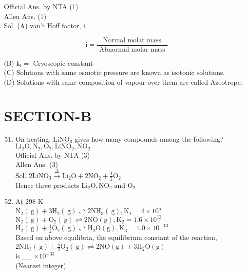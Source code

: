 \documentclass[10pt]{article}
\begin{document}
Official Ans. by NTA (1)\\
Allen Ans. (1)\\
Sol. (A) van't Hoff factor, i

\[
\mathrm{i}=\frac{\text { Normal molar mass }}{\text { Abnormal molar mass }}
\]

(B) \(\mathrm{k}_{\mathrm{f}}=\) Cryoscopic constant\\
(C) Solutions with same osmotic pressure are known as isotonic solutions.\\
(D) Solutions with same composition of vapour over them are called Azeotrope.

\section*{SECTION-B}
\begin{enumerate}
  \setcounter{enumi}{50}
  \item On heating, \(\mathrm{LiNO}_{3}\) gives how many compounds among the following?\\
\(\mathrm{Li}_{2} \mathrm{O}, \mathrm{N}_{2}, \mathrm{O}_{2}, \mathrm{LiNO}_{2}, \mathrm{NO}_{2}\)\\
Official Ans. by NTA (3)\\
Allen Ans. (3)\\
Sol. \(2 \mathrm{Li} \mathrm{NO}_{3} \xrightarrow{\Delta} \mathrm{Li}_{2} \mathrm{O}+2 \mathrm{NO}_{2}+\frac{1}{2} \mathrm{O}_{2}\)\\
Hence three products \(\mathrm{Li}_{2} \mathrm{O}, \mathrm{NO}_{2}\) and \(\mathrm{O}_{2}\)
  \item At 298 K\\
\(\mathrm{N}_{2}(\mathrm{~g})+3 \mathrm{H}_{2}(\mathrm{~g}) \rightleftharpoons 2 \mathrm{NH}_{3}(\mathrm{~g}), \mathrm{K}_{1}=4 \times 10^{5}\)\\
\(\mathrm{N}_{2}(\mathrm{~g})+\mathrm{O}_{2}(\mathrm{~g}) \rightleftharpoons 2 \mathrm{NO}(\mathrm{g}), \mathrm{K}_{2}=1.6 \times 10^{12}\)\\
\(\mathrm{H}_{2}(\mathrm{~g})+\frac{1}{2} \mathrm{O}_{2}(\mathrm{~g}) \rightleftharpoons \mathrm{H}_{2} \mathrm{O}(\mathrm{g}), \mathrm{K}_{3}=1.0 \times 10^{-13}\)\\
Based on above equilibria, the equilibrium constant of the reaction,\\
\(2 \mathrm{NH}_{3}(\mathrm{~g})+\frac{5}{2} \mathrm{O}_{2}(\mathrm{~g}) \rightleftharpoons 2 \mathrm{NO}(\mathrm{g})+3 \mathrm{H}_{2} \mathrm{O}(\mathrm{g})\)\\
is \(\_\_\_\_\) \(\times 10^{-33}\)\\
(Nearest integer)
\end{enumerate}
\end{document}
